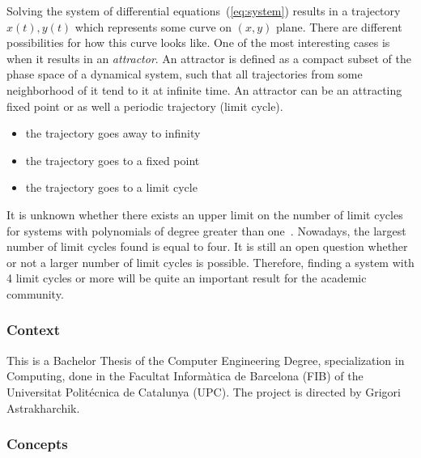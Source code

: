 Solving the system of differential equations~(\ref{eq:system}) results in a trajectory $x(t), y(t)$ which represents some curve on $(x, y)$ plane. There are different possibilities for how this curve looks like. One of the most interesting cases is when it results in an {\it attractor}. An attractor is defined as a compact subset of the phase space of a dynamical system, such that all trajectories from some neighborhood of it tend to it at infinite time. An attractor can be an attracting fixed point or as well a periodic trajectory (limit cycle).

\begin{itemize}
\item the trajectory goes away to infinity
\item the trajectory goes to a fixed point
\item the trajectory goes to a limit cycle
\end{itemize}

It is unknown whether there exists an upper limit on the number of limit cycles
for systems with polynomials of degree greater than
one~\cite{christopher_hilberts_2007,ilyashenko_centennial_2002,llibre_sobre_2015}.
Nowadays, the largest number of limit cycles found is equal to four. It is
still an open question whether or not a larger number of limit cycles is
possible. Therefore, finding a system with 4 limit cycles or more will be quite
an important result for the academic community.

%
%

\subsubsection{Context}

This is a Bachelor Thesis of the Computer Engineering Degree, specialization in
Computing, done in the \textcatalan{Facultat Inform\`atica de Barcelona (FIB)}
of the \textcatalan{Universitat Polit\'ecnica de Catalunya (UPC)}. The project
is directed by Grigori Astrakharchik.

\pagebreak
\subsubsection{Concepts}

